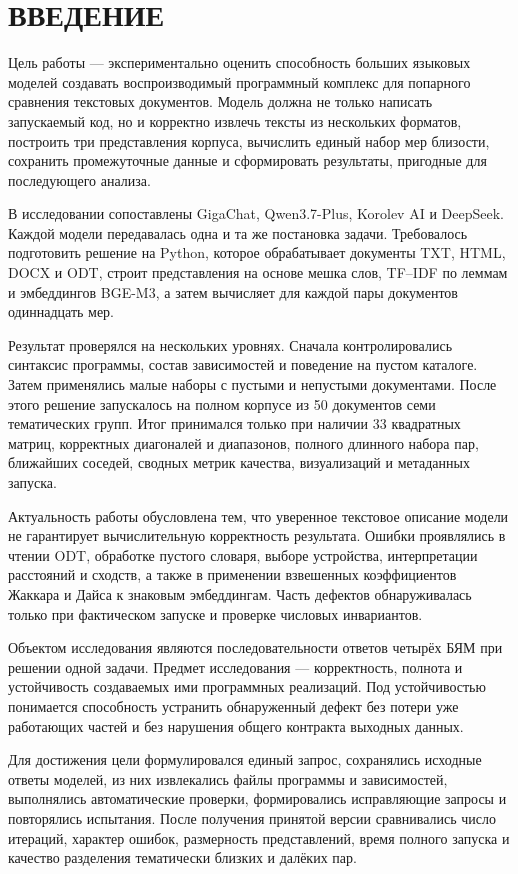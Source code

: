 \documentclass[a4paper,12pt]{extreport}
\begin{document}
\chapter*{ВВЕДЕНИЕ}

Цель работы --- экспериментально оценить способность больших языковых моделей создавать воспроизводимый программный комплекс для попарного сравнения текстовых документов. Модель должна не только написать запускаемый код, но и корректно извлечь тексты из нескольких форматов, построить три представления корпуса, вычислить единый набор мер близости, сохранить промежуточные данные и сформировать результаты, пригодные для последующего анализа.

В исследовании сопоставлены GigaChat, Qwen3.7-Plus, Korolev AI и DeepSeek. Каждой модели передавалась одна и та же постановка задачи. Требовалось подготовить решение на Python, которое обрабатывает документы TXT, HTML, DOCX и ODT, строит представления на основе мешка слов, TF--IDF по леммам и эмбеддингов BGE-M3, а затем вычисляет для каждой пары документов одиннадцать мер.

Результат проверялся на нескольких уровнях. Сначала контролировались синтаксис программы, состав зависимостей и поведение на пустом каталоге. Затем применялись малые наборы с пустыми и непустыми документами. После этого решение запускалось на полном корпусе из 50 документов семи тематических групп. Итог принимался только при наличии 33 квадратных матриц, корректных диагоналей и диапазонов, полного длинного набора пар, ближайших соседей, сводных метрик качества, визуализаций и метаданных запуска.

Актуальность работы обусловлена тем, что уверенное текстовое описание модели не гарантирует вычислительную корректность результата. Ошибки проявлялись в чтении ODT, обработке пустого словаря, выборе устройства, интерпретации расстояний и сходств, а также в применении взвешенных коэффициентов Жаккара и Дайса к знаковым эмбеддингам. Часть дефектов обнаруживалась только при фактическом запуске и проверке числовых инвариантов.

Объектом исследования являются последовательности ответов четырёх БЯМ при решении одной задачи. Предмет исследования --- корректность, полнота и устойчивость создаваемых ими программных реализаций. Под устойчивостью понимается способность устранить обнаруженный дефект без потери уже работающих частей и без нарушения общего контракта выходных данных.

Для достижения цели формулировался единый запрос, сохранялись исходные ответы моделей, из них извлекались файлы программы и зависимостей, выполнялись автоматические проверки, формировались исправляющие запросы и повторялись испытания. После получения принятой версии сравнивались число итераций, характер ошибок, размерность представлений, время полного запуска и качество разделения тематически близких и далёких пар.
\end{document}
